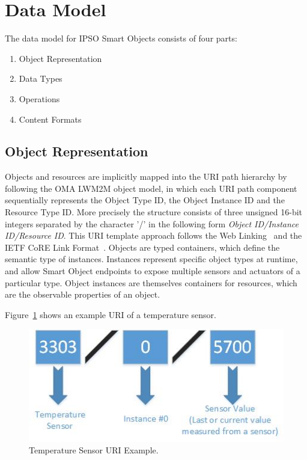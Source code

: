 \documentclass[peerreview, a4paper, 7pt]{IEEEtran}
\begin{document}
\section{Data Model} 

The data model for IPSO Smart Objects consists of four parts:

\begin{enumerate}
\item Object Representation
\item Data Types 
\item Operations 
\item Content Formats
\end{enumerate}


\subsection{Object Representation}

Objects and resources are implicitly mapped into the URI path hierarchy by following the OMA LWM2M object model, in which each URI path component sequentially represents the Object Type ID, the Object Instance ID and the Resource Type ID. More precisely the structure consists of three unsigned 16-bit integers separated by the character '/' in the following form \textit{Object ID/Instance ID/Resource ID}. This URI template approach follows the Web Linking~\cite{rfc5988} and the IETF CoRE Link Format~\cite{rfc6690}. 
Objects are typed containers, which define the semantic type of instances. Instances represent specific object types at runtime, and allow Smart Object endpoints to expose multiple sensors and actuators of a particular type. Object instances are themselves containers for resources, which are the observable properties of an object.

Figure~\ref{temperature-uri-figure} shows an example URI of a temperature sensor. 

\begin{figure}[!t]
 \centering
 \includegraphics[scale=0.50]{temperature-uri.jpg}
 \caption{Temperature Sensor URI Example.}
 \label{temperature-uri-figure}
\end{figure}
\end{document}
